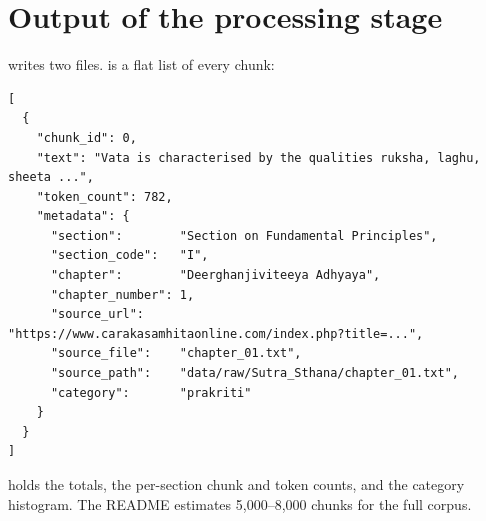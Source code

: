 \section{Output of the processing stage}

 writes two files.  is a flat list of every chunk:

\begin{lstlisting}[style=json]
[
  {
    "chunk_id": 0,
    "text": "Vata is characterised by the qualities ruksha, laghu, sheeta ...",
    "token_count": 782,
    "metadata": {
      "section":        "Section on Fundamental Principles",
      "section_code":   "I",
      "chapter":        "Deerghanjiviteeya Adhyaya",
      "chapter_number": 1,
      "source_url":     "https://www.carakasamhitaonline.com/index.php?title=...",
      "source_file":    "chapter_01.txt",
      "source_path":    "data/raw/Sutra_Sthana/chapter_01.txt",
      "category":       "prakriti"
    }
  }
]
\end{lstlisting}

 holds the totals, the per-section chunk and token counts, and the category histogram. The README estimates 5,000--8,000 chunks for the full corpus.
